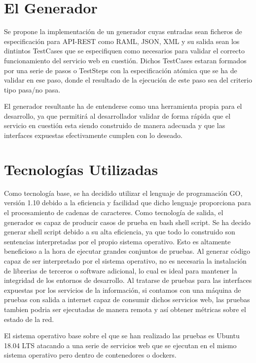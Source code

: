 \documentclass[a4paper,11pt]{book}
\begin{document}
\section{El Generador}

Se propone la implementación de un generador cuyas entradas sean ficheros de especificación para API-REST como RAML, JSON, XML y su salida sean los dintintos TestCases que se especifiquen como necesarios para validar el correcto funcionamiento del servicio web en cuestión. Dichos TestCases estaran formados por una serie de pasos o TestSteps con la especificación atómica que se ha de validar en ese paso, donde el resultado de la ejecución de este paso sea del criterio tipo pasa/no pasa. 

El generador resultante ha de entenderse como una herramienta propia para el desarrollo, ya que permitirá al desarrollador validar de forma rápida que el servicio en cuestión esta siendo construido de manera adecuada y que las interfaces expuestas efectivamente cumplen con lo deseado. 

\section{Tecnologías Utilizadas}

Como tecnología base, se ha decidido utilizar el lenguaje de programación GO\cite{go}, versión 1.10 debido a la eficiencia y facilidad que dicho lenguaje proporciona para el procesamiento de cadenas de caracteres. Como tecnología de salida, el generador es capaz de producir casos de prueba en bash\cite{bash} shell script. Se ha decido generar shell script debido a su alta eficiencia, ya que todo lo construido son sentencias interpretadas por el propio sistema operativo. Esto es altamente beneficioso a la hora de ejecutar grandes conjuntos de pruebas. Al generar código capaz de ser interpretado por el sistema operativo, no es necesaria la instalación de librerias de terceros o software adicional, lo cual es ideal para mantener la integridad de los entornos de desarrollo. Al tratarse de pruebas para las interfaces expuestas por los servicios de la información, si contamos con una máquina de pruebas con salida a internet capaz de consumir dichos servicios web, las pruebas tambien podria ser ejecutadas de manera remota y así obtener métricas sobre el estado de la red. 

El sistema operativo base sobre el que se han realizado las pruebas es Ubuntu\cite{ubuntu} 18.04 LTS atacando a una serie de servicios web que se ejecutan en el mismo sistema operativo pero dentro de contenedores o dockers. 
\end{document}
